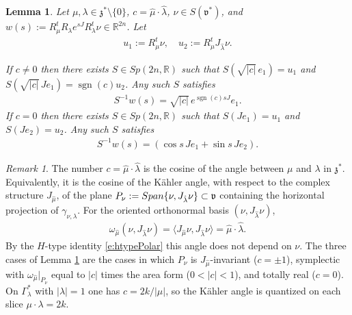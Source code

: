 \documentclass[11pt]{amsart}
\DeclareMathOperator{\sgn}{sgn}
\theoremstyle{plain}
\newtheorem{lemma}[theorem]{Lemma}
\theoremstyle{definition}
\theoremstyle{remark}
\newtheorem{remark}[theorem]{Remark}
\numberwithin{equation}{section}
\def\fz{\mathfrak{z}}
\def\fv{\mathfrak{v}}
\def\mz{\setminus\{0\}}
\def\R{{\mathbb R}}%
\numberwithin{equation}{section}
\begin{document}
\begin{lemma}\label{l:normalForm} Let $\mu, \lambda\in \fz^*\mz$, $c=\hat\mu\cdot\widehat \lambda$, $\nu\in S(\fv^*)$, and $w(s):=R_\mu^tR_\lambda e^{sJ}R_\lambda^t\nu \in \R^{2n}$. Let
    \begin{align*}
        u_1:=R_\mu^t\nu, \quad u_2:=R_\mu^tJ_{\hat{\lambda}}\nu.
    \end{align*}


    If $c\neq 0$ then there exists $S\in Sp(2n, \R)$ such that $S(\sqrt{|c|}\, e_1)=u_1$ and $S(\sqrt{|c|}\, Je_1)=\sgn(c)u_2$. Any such $S$ satisfies
    \begin{align*}
        S^{-1}w(s)=\sqrt{|c|}\, e^{\sgn(c)sJ}e_1.
    \end{align*}
    If $c=0$ then there exists $S\in Sp(2n, \R)$ such that $S(Je_1)=u_1$ and $S(Je_2)=u_2$. Any such $S$ satisfies
    \begin{align*}
        S^{-1}w(s)=(\cos s\, Je_1+\sin s\, Je_2).
    \end{align*}
\end{lemma}
\begin{remark}\label{r:kahlerAngle}
	The number $c=\hat\mu\cdot\hat\lambda$ is the cosine of the angle between $\mu$ and $\lambda$ in $\fz^*$. Equivalently, it is the cosine of the K\"{a}hler angle, with respect to the complex structure $J_{\hat\mu}$, of the plane $P_\nu:={\rm Span}\{\nu, J_{\hat\lambda}\nu\}\subset\fv$ containing the horizontal projection of $\gamma_{\nu, \lambda}$. For the oriented orthonormal basis $(\nu, J_{\hat\lambda}\nu)$,
	\begin{align*}
		\omega_{\hat\mu}(\nu, J_{\hat\lambda}\nu)=\langle J_{\hat\mu}\nu, J_{\hat\lambda}\nu\rangle=\hat\mu\cdot\hat\lambda.
	\end{align*}
	By the $H$-type identity \ref{e:htypePolar} this angle does not depend on $\nu$. The three cases of Lemma \ref{l:normalForm} are the cases in which $P_\nu$ is $J_{\hat\mu}$-invariant ($c=\pm1$), symplectic with $\omega_{\hat\mu}|_{P_\nu}$ equal to $|c|$ times the area form ($0<|c|<1$), and totally real ($c=0$). On $\Gamma_\lambda^*$ with $|\lambda|=1$ one has $c=2k/|\mu|$, so the K\"{a}hler angle is quantized on each slice $\mu\cdot\lambda=2k$.
\end{remark}
\end{document}
